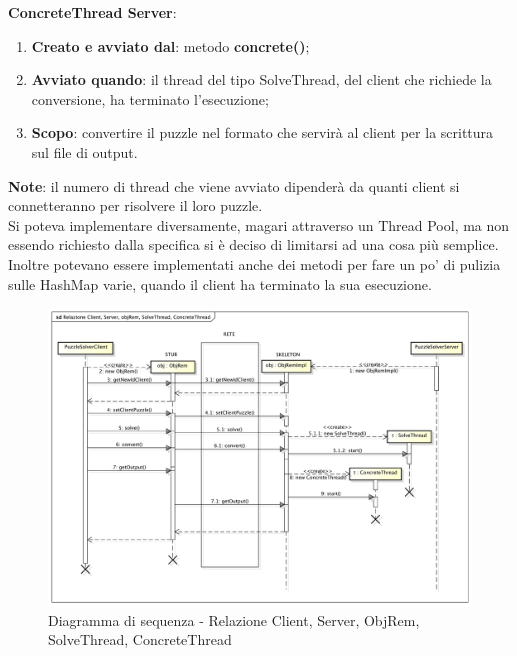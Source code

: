 \textbf{ConcreteThread Server}:
	\begin{enumerate}
		\item \textbf{Creato e avviato dal}: metodo \textbf{concrete()};
		\item \textbf{Avviato quando}: il thread del tipo SolveThread, del client che richiede la conversione, ha terminato l'esecuzione;
		\item \textbf{Scopo}: convertire il puzzle nel formato che servirà al client per la scrittura sul file di output.
	\end{enumerate}
	\noindent
\textbf{Note}: il numero di thread che viene avviato dipenderà da quanti client si connetteranno per risolvere il loro puzzle. \\
Si poteva implementare diversamente, magari attraverso un Thread Pool, ma non essendo richiesto dalla specifica si è deciso di limitarsi ad una cosa più semplice. \\
Inoltre potevano essere implementati anche dei metodi per fare un po' di pulizia sulle HashMap varie, quando il client ha terminato la sua esecuzione.

	\begin{figure}[htbp]
		\centering
		\centerline{\includegraphics[scale=0.4]{img/seq_client_server.pdf}}
		\caption{Diagramma di sequenza - Relazione Client, Server, ObjRem, SolveThread, ConcreteThread}
		\label{fig:dia_seq_rel_client_server}
	\end{figure}	




